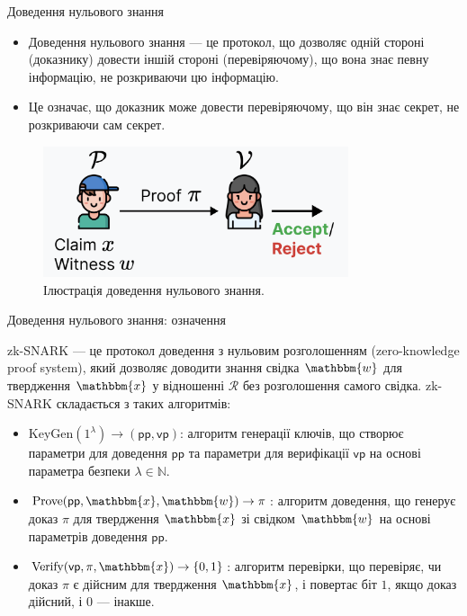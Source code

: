\documentclass{zkdl-presentation-template}
\begin{document}
    \begin{frame}{Доведення нульового знання}
        \begin{itemize}
            \item Доведення нульового знання --- це протокол, що дозволяє
            одній стороні (доказнику) довести іншій стороні (перевіряючому),
            що вона знає певну інформацію, не розкриваючи цю інформацію.
            \item Це означає, що доказник може довести перевіряючому, що він
            знає секрет, не розкриваючи сам секрет.
        \end{itemize}
        
        \begin{figure}
            \centering
            \includegraphics[width=0.8\textwidth]{images/zk.png}
            \caption{Ілюстрація доведення нульового знання.}
            \label{fig:zk}
        \end{figure}
    \end{frame}

    \begin{frame}{Доведення нульового знання: означення}
        \begin{definition}
            zk-SNARK — це протокол доведення з нульовим розголошенням (zero-knowledge proof system), 
            який дозволяє доводити знання свідка $\mathbbm{w}$ для твердження $\mathbbm{x}$ 
            у відношенні $\mathcal{R}$ без розголошення самого свідка. zk-SNARK складається з таких алгоритмів:
            \begin{itemize}
                \item $\mathrm{KeyGen}(1^{\lambda}) \to (\mathsf{pp},\mathsf{vp})$: 
                алгоритм генерації ключів, що створює параметри для доведення $\mathsf{pp}$ 
                та параметри для верифікації $\mathsf{vp}$ на основі параметра безпеки $\lambda \in \mathbb{N}$.
        
                \item $\mathrm{Prove}(\mathsf{pp}, \mathbbm{x}, \mathbbm{w}) \to \pi$: 
                алгоритм доведення, що генерує доказ $\pi$ для твердження $\mathbbm{x}$ 
                зі свідком $\mathbbm{w}$ на основі параметрів доведення $\mathsf{pp}$.
        
                \item $\mathrm{Verify}(\mathsf{vp}, \pi, \mathbbm{x}) \to \{0, 1\}$: 
                алгоритм перевірки, що перевіряє, чи доказ $\pi$ є дійсним для твердження $\mathbbm{x}$, 
                і повертає біт $1$, якщо доказ дійсний, і $0$ — інакше.
            \end{itemize}
        \end{definition}        
    \end{frame}
\end{document}
